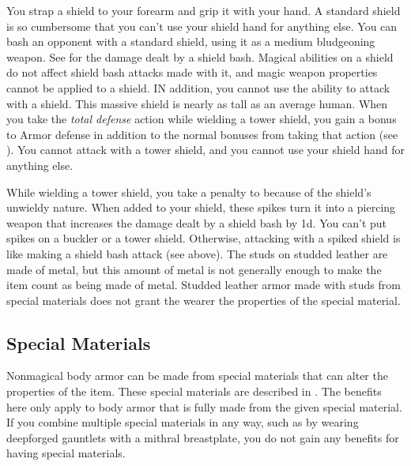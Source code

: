          You strap a shield to your forearm and grip it with your hand. A standard shield is so cumbersome that you can't use your shield hand for anything else.
        \label{Shield Bash Attacks} You can bash an opponent with a standard shield, using it as a medium bludgeoning weapon. See  for the damage dealt by a shield bash.
        Magical abilities on a shield do not affect shield bash attacks made with it, and magic weapon properties cannot be applied to a shield.
        IN addition, you cannot use the  ability to attack with a shield.
         This massive shield is nearly as tall as an average human.
        When you take the \textit{total defense} action while wielding a tower shield, you gain a  bonus to Armor defense in addition to the normal bonuses from taking that action (see ).
        You cannot attack with a tower shield, and you cannot use your shield hand for anything else.

        While wielding a tower shield, you take a  penalty to  because of the shield's unwieldy nature.
         When added to your shield, these spikes turn it into a piercing weapon that increases the damage dealt by a shield bash by \plus1d. You can't put spikes on a buckler or a tower shield. Otherwise, attacking with a spiked shield is like making a shield bash attack (see above).
         The studs on studded leather are made of metal, but this amount of metal is not generally enough to make the item count as being made of metal.
        Studded leather armor made with studs from special materials does not grant the wearer the properties of the special material.

    \subsection{Special Materials}\label{Special Materials}
        Nonmagical body armor can be made from special materials that can alter the properties of the item.
        These special materials are described in .
        The benefits here only apply to body armor that is fully made from the given special material.
        If you combine multiple special materials in any way, such as by wearing deepforged gauntlets with a mithral breastplate, you do not gain any benefits for having special materials.

